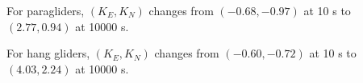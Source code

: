 For paragliders, $(K_E,K_N)$ changes from $(-0.68,-0.97)$ at 10 s to $(2.77,0.94)$ at 10000 s.

For hang gliders, $(K_E,K_N)$ changes from $(-0.60,-0.72)$ at 10 s to $(4.03,2.24)$ at 10000 s.

